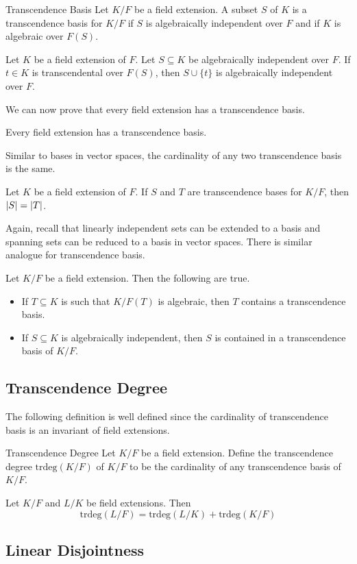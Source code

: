 \documentclass[a4paper]{article}
\begin{document}
\begin{defn}{Transcendence Basis}{} Let $K/F$ be a field extension. A subset $S$ of $K$ is a transcendence basis for $K/F$ if $S$ is algebraically independent over $F$ and if $K$ is algebraic over $F(S)$. 
\end{defn}

\begin{lmm}{}{} Let $K$ be a field extension of $F$. Let $S\subseteq K$ be algebraically independent over $F$. If $t\in K$ is transcendental over $F(S)$, then $S\cup\{t\}$ is algebraically independent over $F$. 
\end{lmm}

We can now prove that every field extension has a transcendence basis. 

\begin{prp}{}{} Every field extension has a transcendence basis. 
\end{prp}

Similar to bases in vector spaces, the cardinality of any two transcendence basis is the same. 

\begin{thm}{}{} Let $K$ be a field extension of $F$. If $S$ and $T$ are transcendence bases for $K/F$, then $\abs{S}=\abs{T}$. 
\end{thm}

Again, recall that linearly independent sets can be extended to a basis and spanning sets can be reduced to a basis in vector spaces. There is similar analogue for transcendence basis. 

\begin{thm}{}{} Let $K/F$ be a field extension. Then the following are true. 
\begin{itemize}
\item If $T\subseteq K$ is such that $K/F(T)$ is algebraic, then $T$ contains a transcendence basis. 
\item If $S\subseteq K$ is algebraically independent, then $S$ is contained in a transcendence basis of $K/F$. 
\end{itemize}
\end{thm}

\subsection{Transcendence Degree}
The following definition is well defined since the cardinality of transcendence basis is an invariant of field extensions. 

\begin{defn}{Transcendence Degree}{} Let $K/F$ be a field extension. Define the transcendence degree $\text{trdeg}(K/F)$ of $K/F$ to be the cardinality of any transcendence basis of $K/F$. 
\end{defn}

\begin{prp}{}{} Let $K/F$ and $L/K$ be field extensions. Then $$\text{trdeg}(L/F)=\text{trdeg}(L/K)+\text{trdeg}(K/F)$$
\end{prp}

\subsection{Linear Disjointness}
\end{document}
